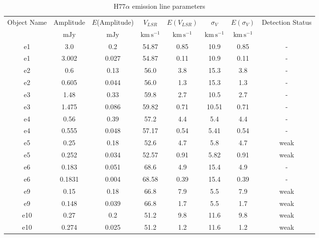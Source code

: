 \begin{table*}[htp]
\caption{H$77\alpha$ emission line parameters}
\begin{tabular}{cccccccc}
\label{tab:h77a}
Object Name & Amplitude & $E$(Amplitude) & $V_{LSR}$ & $E(V_{LSR})$ & $\sigma_V$ & $E(\sigma_V)$ & Detection Status \\
 & $\mathrm{mJy}$ & $\mathrm{mJy}$ & $\mathrm{km\,s^{-1}}$ & $\mathrm{km\,s^{-1}}$ & $\mathrm{km\,s^{-1}}$ & $\mathrm{km\,s^{-1}}$ &  \\
\hline
e1 & 3.0 & 0.2 & 54.87 & 0.85 & 10.9 & 0.85 & - \\
e1 & 3.002 & 0.027 & 54.87 & 0.11 & 10.9 & 0.11 & - \\
e2 & 0.6 & 0.13 & 56.0 & 3.8 & 15.3 & 3.8 & - \\
e2 & 0.605 & 0.044 & 56.0 & 1.3 & 15.3 & 1.3 & - \\
e3 & 1.48 & 0.33 & 59.8 & 2.7 & 10.5 & 2.7 & - \\
e3 & 1.475 & 0.086 & 59.82 & 0.71 & 10.51 & 0.71 & - \\
e4 & 0.56 & 0.39 & 57.2 & 4.4 & 5.4 & 4.4 & - \\
e4 & 0.555 & 0.048 & 57.17 & 0.54 & 5.41 & 0.54 & - \\
e5 & 0.25 & 0.18 & 52.6 & 4.7 & 5.8 & 4.7 & weak \\
e5 & 0.252 & 0.034 & 52.57 & 0.91 & 5.82 & 0.91 & weak \\
e6 & 0.183 & 0.051 & 68.6 & 4.9 & 15.4 & 4.9 & - \\
e6 & 0.1831 & 0.004 & 68.58 & 0.39 & 15.4 & 0.39 & - \\
e9 & 0.15 & 0.18 & 66.8 & 7.9 & 5.5 & 7.9 & weak \\
e9 & 0.148 & 0.039 & 66.8 & 1.7 & 5.5 & 1.7 & weak \\
e10 & 0.27 & 0.2 & 51.2 & 9.8 & 11.6 & 9.8 & weak \\
e10 & 0.274 & 0.025 & 51.2 & 1.2 & 11.6 & 1.2 & weak \\
\hline
\end{tabular}
\end{table*}
